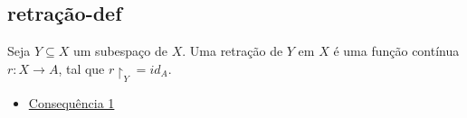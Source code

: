 \subsection{retração-def}
\label{retração-def}


\begin{defi}[Retração]
Seja $Y \subseteq X$ um subespaço de $X$. Uma retração de $Y$ em $X$ é uma função contínua $r:X \longrightarrow A$, tal que $r\restriction_Y = id_A$.
\end{defi}


\begin{itemize}{Lista de consequências}
    \item \hyperref[teo-ponto-fixo-Brower]{Consequência 1}
\end{itemize}
